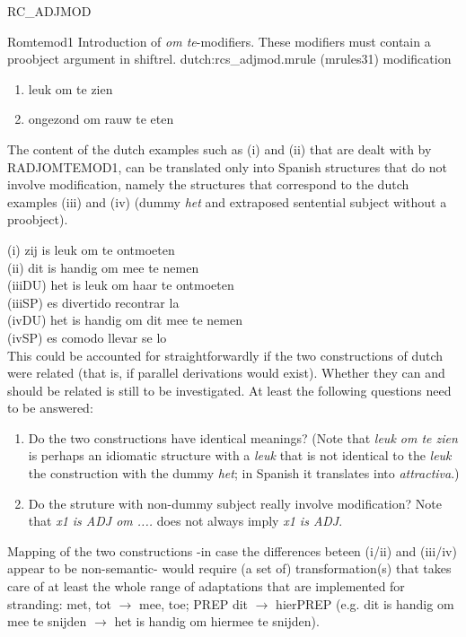 \begin{mruleclass}{RC\_ADJMOD}
\begin{members}
\begin{member}
\end{member}
\begin{member}
 Romtemod1
  Introduction of {\em om te}-modifiers. These modifiers
must contain a proobject argument in shiftrel. 
\file dutch:rcs\_adjmod.mrule (mrules31)
\semantics modification 

\example\mbox{}
\begin{enumerate}
  \item leuk om te zien
  \item ongezond  om rauw te eten
\end{enumerate}
\remarks
The content of the dutch examples such as (i) and (ii)
that are dealt with
by RADJOMTEMOD1, 
can be  translated only 
into 
Spanish structures that do not involve modification, namely the structures that
correspond to the dutch examples (iii) and (iv) 
(dummy {\em het} and extraposed sentential 
subject without a proobject).

(i) zij is leuk om te ontmoeten \\ 
(ii) dit is handig om mee te nemen\\ 
(iiiDU) het is leuk om haar te ontmoeten\\
(iiiSP) es divertido recontrar la\\
(ivDU) het is handig om dit mee te nemen\\
(ivSP) es comodo llevar se lo\\

This could be accounted for straightforwardly if the two  constructions
of dutch were related (that is, if parallel derivations would exist). 
Whether they can and should be related is still to be investigated. 
At least the following questions need to be answered: 

\begin{enumerate}

\item
Do the two constructions 
have identical meanings? (Note that {\em leuk om te zien} is perhaps an 
idiomatic structure with a {\em leuk} that is not identical to the 
{\em leuk} the construction with the dummy {\em het}; in Spanish it 
translates into  {\em attractiva}.) 

\item
Do the struture with non-dummy subject really involve modification?
Note that {\em x1 is ADJ om ....} does not always imply {\em x1 is ADJ}.
\end{enumerate}

Mapping of the two constructions -in case 
the differences beteen (i/ii) and (iii/iv) appear to be non-semantic- 
would require (a set of) transformation(s) that takes care of 
at least the whole range of adaptations that are implemented for stranding:
met, tot $\rightarrow$ mee, toe; PREP dit $\rightarrow$ hierPREP 
(e.g. dit is handig om mee te snijden $\rightarrow$ 
het is handig om hiermee te snijden).

\end{member}
\end{members}
\end{mruleclass}

